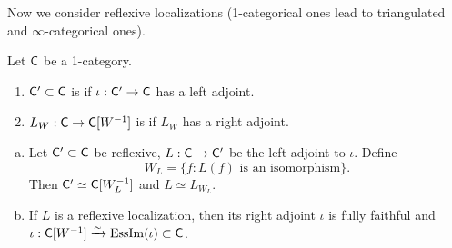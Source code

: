 Now we consider reflexive localizations (1-categorical ones lead to triangulated and
$\infty$-categorical ones).
\begin{definition}
Let $\mathsf{C}$ be a 1-category.
\begin{enumerate}[1)]
\item $\mathsf{C}'\subset \mathsf{C}$ is  if $\iota:\C'\to \C$ has a left adjoint.
\item $L_W:\C\to \C[W^{-1}]$ is  if $L_W$ has a right adjoint.
\end{enumerate}
\end{definition}

\begin{lemma} \leavevmode
\begin{enumerate}[a)]
\item Let $\mathsf{C}'\subset \mathsf{C}$ be reflexive, $L:\C\to \C'$ be the left adjoint to $\iota$. Define
\[
W_L=\{f:L(f)\text{ is an isomorphism}\}.
\]
Then $\mathsf{C}'\simeq \mathsf{C}[W_L^{-1}]$ and $L\simeq L_{W_L}$.
\item If $L$ is a reflexive localization, then its right adjoint $\iota$ is fully
faithful and $\iota:\mathsf{C}[W^{-1}] \xrightarrow{\sim} \operatorname{EssIm}(\iota)\subset \mathsf{C}$.
\end{enumerate}
\end{lemma}

